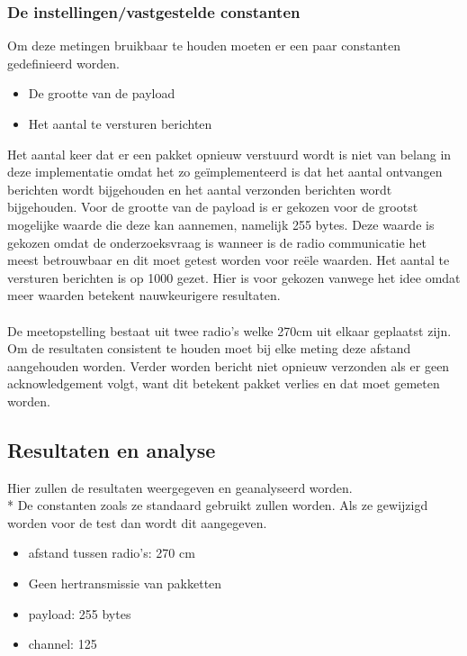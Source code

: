 \documentclass{article}
\begin{document}
\subsubsection{De instellingen/vastgestelde constanten}
Om deze metingen bruikbaar te houden moeten er een paar constanten gedefinieerd worden.
\begin{itemize}
	\item De grootte van de payload
	\item Het aantal te versturen berichten
\end{itemize}
Het aantal keer dat er een pakket opnieuw verstuurd wordt is niet van belang in deze implementatie omdat het zo ge\"{i}mplementeerd is dat het aantal ontvangen berichten wordt bijgehouden en het aantal verzonden berichten wordt bijgehouden. 
Voor de grootte van de payload is er gekozen voor de grootst mogelijke waarde die deze kan aannemen, namelijk 255 bytes. Deze waarde is gekozen omdat de onderzoeksvraag is wanneer is de radio communicatie het meest betrouwbaar en dit moet getest worden voor re\"{e}le waarden. 
Het aantal te versturen berichten is op 1000 gezet. Hier is voor gekozen vanwege het idee omdat meer waarden betekent nauwkeurigere resultaten.
\\
\\
De meetopstelling bestaat uit twee radio's welke 270cm uit elkaar geplaatst zijn. Om de resultaten consistent te houden moet bij elke meting deze afstand aangehouden worden. 
Verder worden bericht niet opnieuw verzonden als er geen acknowledgement volgt, want dit betekent pakket verlies en dat moet gemeten worden. 

\subsection{Resultaten en analyse}
Hier zullen de resultaten weergegeven en geanalyseerd worden. \\*
  De constanten zoals ze standaard gebruikt zullen worden. Als ze gewijzigd worden voor de test dan wordt dit aangegeven. 
  \begin{itemize}
  	\item afstand tussen radio's: 270 cm
  	\item Geen hertransmissie van pakketten
  	\item payload: 255 bytes
  	\item channel: 125
  \end{itemize}
  
\end{document}
